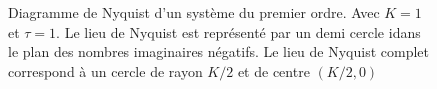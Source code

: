 \begin{figure}[!h]
\begin{center}
\end{center}
\caption{Diagramme de Nyquist d'un système du premier ordre. 
    Avec $K=1$ et $\tau=1$. Le lieu de Nyquist 
    est représenté par un demi cercle idans le plan des nombres 
    imaginaires négatifs. Le lieu de Nyquist complet correspond à un cercle de rayon $K/2$ et de centre $(K/2,0)$ 
    \label{fig-nyquist_1er}}
\end{figure}



